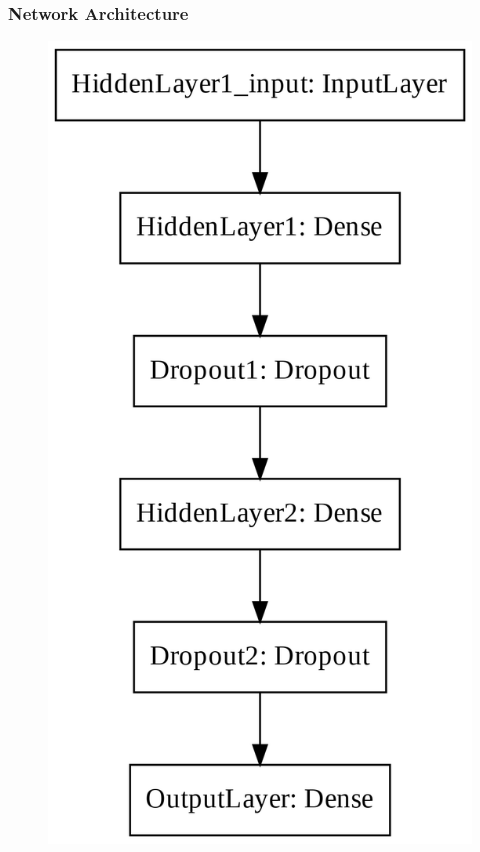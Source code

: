 \subsubsection{Network Architecture}\label{ch5:ann_structure}
\begin{figure}[!htp]
\centering
\begin{minipage}[b][][b]{.35\linewidth}
    \includegraphics[width=\linewidth]{templates/images/Figure-TF_NN_Structure.png}

\end{minipage}
\end{figure}
